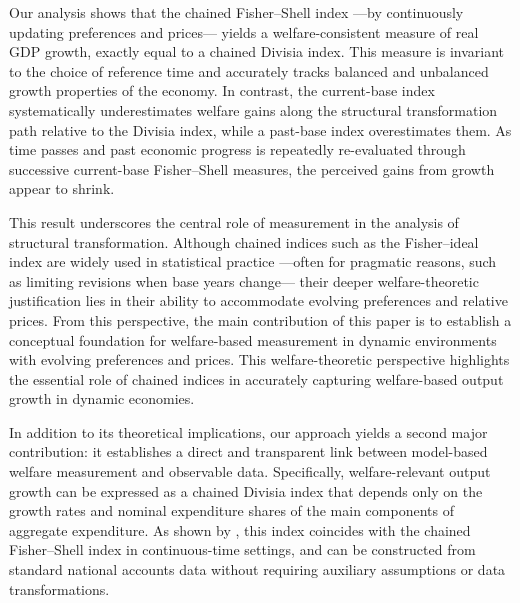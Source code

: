 \documentclass[12pt,a4paper]{article}
\newcommand{\red}[1]{\textcolor{red}{#1}} %
\begin{document}

Our analysis shows that the chained Fisher–Shell index —by continuously updating preferences and prices— yields a welfare-consistent measure of real GDP growth, exactly equal to a chained Divisia index. This measure is invariant to the choice of reference time and accurately tracks balanced and unbalanced growth properties of the economy. In contrast, the current-base index systematically underestimates welfare gains along the structural transformation path relative to the Divisia index, while a past-base index overestimates them. As time passes and past economic progress is repeatedly re-evaluated through successive current-base Fisher–Shell measures, the perceived gains from growth appear to shrink. 

This result underscores the central role of measurement in the analysis of structural transformation. Although chained indices such as the Fisher–ideal index are widely used in statistical practice —often for pragmatic reasons, such as limiting revisions when base years change— their deeper welfare-theoretic justification lies in their ability to accommodate evolving preferences and relative prices. From this perspective, the main contribution of this paper is to establish a conceptual foundation for welfare-based measurement in dynamic environments with evolving preferences and prices. This welfare-theoretic perspective highlights the essential role of chained indices in accurately capturing welfare-based output growth in dynamic economies.

In addition to its theoretical implications, our approach yields a second major contribution: it establishes a direct and transparent link between model-based welfare measurement and observable data. Specifically, welfare-relevant output growth can be expressed as a chained Divisia index that depends only on the growth rates and nominal expenditure shares of the main components of aggregate expenditure. As shown by \citet{duran_licandro_2024}, this index coincides with the chained Fisher–Shell index in continuous-time settings, and can be constructed from standard national accounts data without requiring auxiliary assumptions or data transformations.
\end{document}
